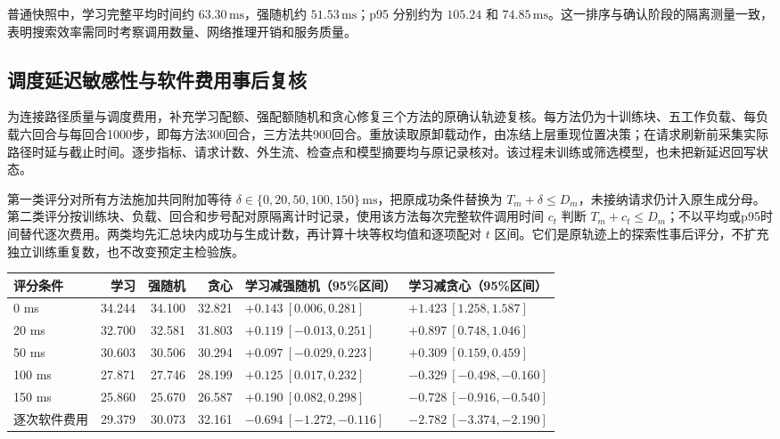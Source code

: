 普通快照中，学习完整平均时间约 $63.30\,\mathrm{ms}$，强随机约 $51.53\,\mathrm{ms}$；p95 分别约为 $105.24$ 和 $74.85\,\mathrm{ms}$。这一排序与确认阶段的隔离测量一致，表明搜索效率需同时考察调用数量、网络推理开销和服务质量。

\subsection{调度延迟敏感性与软件费用事后复核}
\label{legacy:sec:ch5-delay-audit}

为连接路径质量与调度费用，补充学习配额、强配额随机和贪心修复三个方法的原确认轨迹复核。每方法仍为十训练块、五工作负载、每负载六回合与每回合1000步，即每方法300回合，三方法共900回合。重放读取原卸载动作，由冻结上层重现位置决策；在请求刷新前采集实际路径时延与截止时间。逐步指标、请求计数、外生流、检查点和模型摘要均与原记录核对。该过程未训练或筛选模型，也未把新延迟回写状态。

第一类评分对所有方法施加共同附加等待 $\delta\in\{0,20,50,100,150\}\,\mathrm{ms}$，把原成功条件替换为 $T_m+\delta\leq D_m$，未接纳请求仍计入原生成分母。第二类评分按训练块、负载、回合和步号配对原隔离计时记录，使用该方法每次完整软件调用时间 $c_t$ 判断 $T_m+c_t\leq D_m$；不以平均或p95时间替代逐次费用。两类均先汇总块内成功与生成计数，再计算十块等权均值和逐项配对 $t$ 区间。它们是原轨迹上的探索性事后评分，不扩充独立训练重复数，也不改变预定主检验族。

\begin{table}[!htbp]
 \centering
 \label{legacy:tab:ch5-delay-audit}
 \footnotesize
 \setlength{\tabcolsep}{3pt}
 \begin{tabular}{lrrrll}
  \toprule
  评分条件 & 学习 & 强随机 & 贪心 & 学习减强随机（95\%区间） & 学习减贪心（95\%区间） \\
  \midrule
  0 ms & 34.244 & 34.100 & 32.821 & $+0.143\ [0.006,0.281]$ & $+1.423\ [1.258,1.587]$ \\
  20 ms & 32.700 & 32.581 & 31.803 & $+0.119\ [-0.013,0.251]$ & $+0.897\ [0.748,1.046]$ \\
  50 ms & 30.603 & 30.506 & 30.294 & $+0.097\ [-0.029,0.223]$ & $+0.309\ [0.159,0.459]$ \\
  100 ms & 27.871 & 27.746 & 28.199 & $+0.125\ [0.017,0.232]$ & $-0.329\ [-0.498,-0.160]$ \\
  150 ms & 25.860 & 25.670 & 26.587 & $+0.190\ [0.082,0.298]$ & $-0.728\ [-0.916,-0.540]$ \\
  逐次软件费用 & 29.379 & 30.073 & 32.161 & $-0.694\ [-1.272,-0.116]$ & $-2.782\ [-3.374,-2.190]$ \\
  \bottomrule
 \end{tabular}
\end{table}

